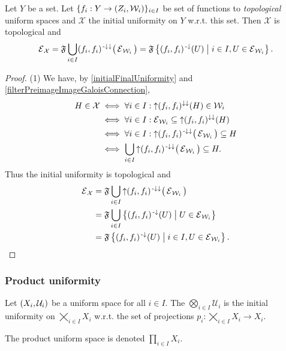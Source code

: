 \begin{proposition} \label{topologicalInitialUniformity}
Let $Y$ be a set. Let $\{f_i: Y\to \left( Z_i, \mathcal{W}_i \right)\}_{i\in I}$ be set of functions to \emph{topological} uniform spaces and $\mathcal{X}$ the initial uniformity on $Y$ w.r.t. this set. Then $\mathcal{X}$ is topological and
\[ \operatorname{\mathcal{E}}_\mathcal{X} = \mathfrak{F}\bigcup_{i\in I} (f_i,f_i)^{{\text{\hspace{0.15em}-}\downarrow}\downarrow}\big(\operatorname{\mathcal{E}}_{\mathcal{W}_i}\big) = \mathfrak{F}\left\{ (f_i,f_i)^{\text{\hspace{0.15em}-}\downarrow}(U) \;\middle|\; i\in I, U\in \operatorname{\mathcal{E}}_{\mathcal{W}_i} \right\}. \]
\end{proposition}
\begin{proof}
(1) We have, by \ref{initialFinalUniformity} and \ref{filterPreimageImageGaloisConnection},
\begin{align*}
H \in \mathcal{X} &\iff \forall i\in I: \operatorname{\uparrow}(f_i,f_i)^{\downarrow\downarrow}(H) \in \mathcal{W}_i \\
&\iff \forall i\in I: \operatorname{\mathcal{E}}_{\mathcal{W}_i} \subseteq \operatorname{\uparrow}(f_i,f_i)^{\downarrow\downarrow}(H) \\
&\iff \forall i\in I: \operatorname{\uparrow} (f_i,f_i)^{{\text{\hspace{0.15em}-}\downarrow}\downarrow}\big(\operatorname{\mathcal{E}}_{\mathcal{W}_i}\big) \subseteq H \\
&\iff \bigcup_{i\in I} \operatorname{\uparrow} (f_i,f_i)^{{\text{\hspace{0.15em}-}\downarrow}\downarrow}\big(\operatorname{\mathcal{E}}_{\mathcal{W}_i}\big) \subseteq H.
\end{align*}
Thus the initial uniformity is topological and
\begin{align*}
\operatorname{\mathcal{E}}_\mathcal{X} &= \mathfrak{F}\bigcup_{i\in I} \operatorname{\uparrow} (f_i,f_i)^{{\text{\hspace{0.15em}-}\downarrow}\downarrow}\big(\operatorname{\mathcal{E}}_{\mathcal{W}_i}\big) \\
&= \mathfrak{F}\bigcup_{i\in I}\left\{ (f_i,f_i)^{\text{\hspace{0.15em}-}\downarrow}(U) \;\middle|\; U\in \operatorname{\mathcal{E}}_{\mathcal{W}_i} \right\} \\
&= \mathfrak{F}\left\{ (f_i,f_i)^{\text{\hspace{0.15em}-}\downarrow}(U) \;\middle|\; i\in I, U\in \operatorname{\mathcal{E}}_{\mathcal{W}_i} \right\}.
\end{align*}
\end{proof}

\subsubsection{Product uniformity}
\begin{definition}
Let $\left( X_i, \mathcal{U}_i \right)$ be a uniform space for all $i\in I$. The  $\bigotimes_{i\in I}\mathcal{U}_i$ is the initial uniformity on $\bigtimes_{i\in I}X_i$ w.r.t. the set of projections $p_i: \bigtimes_{i\in I}X_i \to X_i$.

The product uniform space is denoted $\prod_{i\in I}X_i$.
\end{definition}





